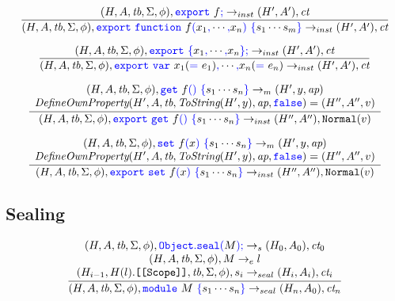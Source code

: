 \documentclass[a4paper]{article}
\newcommand{\code}[1]{\textcolor{blue}{\tt #1}}
\newcommand{\tb}{\emph{tb}}
\newcommand{\ct}{\emph{ct}}
\newcommand{\ap}{\emph{ap}}
\begin{document}
\begin{equation*}
\frac{
    (H, A, \tb, \Sigma, \phi), \code{export}\ f\code{;} \rightarrow_{inst} (H', A'), \ct
}{
    (H, A, \tb, \Sigma, \phi), \code{export}\ \code{function}\ f\code{(}x_1\code{,} \cdots\code{,}x_n\code{)}\ \code{\{} s_1 \cdots s_m \code{\}} \rightarrow_{inst} (H', A'), \ct
}
\end{equation*}

\begin{equation*}
\frac{
    (H, A, \tb, \Sigma, \phi), \code{export}\ \code{\{}x_1\code{,} \cdots\code{,} x_n\code{\}}\code{;} \rightarrow_{inst} (H', A'), \ct
}{
    (H, A, \tb, \Sigma, \phi), \code{export}\ \code{var}\ x_1(\code{=}\ e_1)\code{,} \cdots\code{,}x_n(\code{=}\ e_n) \rightarrow_{inst} (H', A'), \ct
}
\end{equation*}

\begin{equation*}
\frac{
    \begin{array}{c}
    (H, A, \tb, \Sigma, \phi), \code{get}\ f\code{(}\code{)}\ \code{\{} s_1 \cdots s_n \code{\}} \rightarrow_m (H', y,\ap) \\
    \emph{DefineOwnProperty}(H', A, \tb, \emph{ToString}(H', y), \ap, \code{false}) = (H'', A'', v)
    \end{array}
}{
    (H, A, \tb, \Sigma, \phi), \code{export}\ \code{get}\ f\code{(}\code{)}\ \code{\{} s_1 \cdots s_n \code{\}} \rightarrow_{inst} (H'', A''), \texttt{Normal}(v)
}
\end{equation*}

\begin{equation*}
\frac{
    \begin{array}{c}
    (H, A, \tb, \Sigma, \phi), \code{set}\ f\code{(}x\code{)}\ \code{\{} s_1 \cdots s_n \code{\}} \rightarrow_m (H', y,\ap) \\
    \emph{DefineOwnProperty}(H', A, \tb, \emph{ToString}(H', y), \ap, \code{false}) = (H'', A'', v)
    \end{array}
}{
    (H, A, \tb, \Sigma, \phi), \code{export}\ \code{set}\ f\code{(}x\code{)}\ \code{\{} s_1 \cdots s_n \code{\}} \rightarrow_{inst} (H'', A''), \texttt{Normal}(v)
}
\end{equation*}

\subsection{Sealing}

\begin{equation*}
\frac{
    \begin{array}{c}
    (H, A, \tb, \Sigma, \phi), \code{Object.seal(}M\code{);} \rightarrow_s (H_0, A_0), \ct_0 \\
    (H, A, \tb, \Sigma, \phi), M \rightarrow_e l \\
    (H_{i-1}, H(l).\texttt{[[Scope]]}, \tb, \Sigma, \phi), s_i \rightarrow_{seal} (H_i, A_i), \ct_i \\
    \end{array}
}{
    (H, A, \tb, \Sigma, \phi), \code{module}\ M\ \code{\{} s_1 \cdots s_n \code{\}} \rightarrow_{seal} (H_n, A_0), \ct_n
}
\end{equation*}
\end{document}
